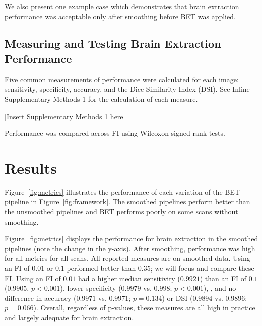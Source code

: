 \documentclass{elsarticle}\usepackage[]{graphicx}\usepackage[]{color}
\begin{document}
We also present one example case which demonstrates that brain extraction performance was acceptable only after smoothing before BET was applied.  


\subsection{Measuring and Testing Brain Extraction Performance}
Five common measurements of performance were calculated for each image: sensitivity, specificity, accuracy, and the Dice Similarity Index (DSI).  See Inline Supplementary Methods 1 for the calculation of each measure.

[Insert Supplementary Methods 1 here]

Performance was compared across FI using Wilcoxon signed-rank tests.




\section{Results}
Figure~\ref{fig:metrics}\protect{} illustrates the performance of each variation of the BET pipeline in Figure~\ref{fig:framework}.  The smoothed pipelines perform better than the unsmoothed pipelines and BET performs poorly on some scans without smoothing.  

Figure~\ref{fig:metrics}\protect{} displays the performance for brain extraction in the smoothed pipelines (note the change in the y-axis).  After smoothing, performance was high for all metrics for all scans.  All reported measures are on smoothed data.  
Using an FI of $0.01$ or $0.1$ performed better than $0.35$; we will focus and compare these FI.  Using an FI of $0.01$ had a higher median sensitivity ($0.9921$) than an FI of $0.1$ ($0.9905$, $p< 0.001$), lower specificity ($0.9979$ vs. $0.998$; $p< 0.001$), , and no difference in accuracy ($0.9971$ vs. $0.9971$; $p= 0.134$) or DSI ($0.9894$ vs. $0.9896$; $p= 0.066$).  Overall, regardless of p-values, these measures are all high in practice and largely adequate for brain extraction.

% 
% 
\end{document}

